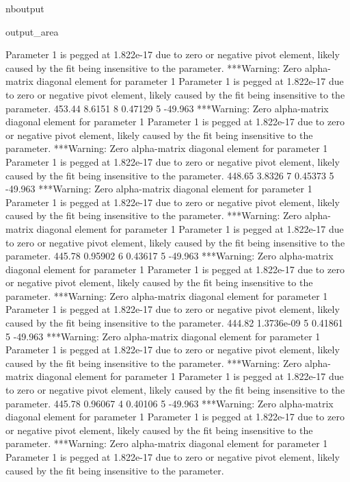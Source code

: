 \documentclass[letterpaper,10pt,english]{sphinxmanual}
\begin{document}
\begin{sphinxuseclass}{nboutput}
{\begin{sphinxuseclass}{output_area}
\begin{sphinxuseclass}{}
\begin{sphinxVerbatim}[commandchars=\\\{\}]
 Parameter 1 is pegged at 1.822e-17 due to zero or negative pivot element, likely
 caused by the fit being insensitive to the parameter.
***Warning: Zero alpha-matrix diagonal element for parameter 1
 Parameter 1 is pegged at 1.822e-17 due to zero or negative pivot element, likely
 caused by the fit being insensitive to the parameter.
          453.44      8.6151    8     0.47129    5     -49.963
***Warning: Zero alpha-matrix diagonal element for parameter 1
 Parameter 1 is pegged at 1.822e-17 due to zero or negative pivot element, likely
 caused by the fit being insensitive to the parameter.
***Warning: Zero alpha-matrix diagonal element for parameter 1
 Parameter 1 is pegged at 1.822e-17 due to zero or negative pivot element, likely
 caused by the fit being insensitive to the parameter.
          448.65      3.8326    7     0.45373    5     -49.963
***Warning: Zero alpha-matrix diagonal element for parameter 1
 Parameter 1 is pegged at 1.822e-17 due to zero or negative pivot element, likely
 caused by the fit being insensitive to the parameter.
***Warning: Zero alpha-matrix diagonal element for parameter 1
 Parameter 1 is pegged at 1.822e-17 due to zero or negative pivot element, likely
 caused by the fit being insensitive to the parameter.
          445.78     0.95902    6     0.43617    5     -49.963
***Warning: Zero alpha-matrix diagonal element for parameter 1
 Parameter 1 is pegged at 1.822e-17 due to zero or negative pivot element, likely
 caused by the fit being insensitive to the parameter.
***Warning: Zero alpha-matrix diagonal element for parameter 1
 Parameter 1 is pegged at 1.822e-17 due to zero or negative pivot element, likely
 caused by the fit being insensitive to the parameter.
          444.82  1.3736e-09    5     0.41861    5     -49.963
***Warning: Zero alpha-matrix diagonal element for parameter 1
 Parameter 1 is pegged at 1.822e-17 due to zero or negative pivot element, likely
 caused by the fit being insensitive to the parameter.
***Warning: Zero alpha-matrix diagonal element for parameter 1
 Parameter 1 is pegged at 1.822e-17 due to zero or negative pivot element, likely
 caused by the fit being insensitive to the parameter.
          445.78     0.96067    4     0.40106    5     -49.963
***Warning: Zero alpha-matrix diagonal element for parameter 1
 Parameter 1 is pegged at 1.822e-17 due to zero or negative pivot element, likely
 caused by the fit being insensitive to the parameter.
***Warning: Zero alpha-matrix diagonal element for parameter 1
 Parameter 1 is pegged at 1.822e-17 due to zero or negative pivot element, likely
 caused by the fit being insensitive to the parameter.

\end{sphinxVerbatim}
\end{sphinxuseclass}
\end{sphinxuseclass}}
\end{sphinxuseclass}
\end{document}
